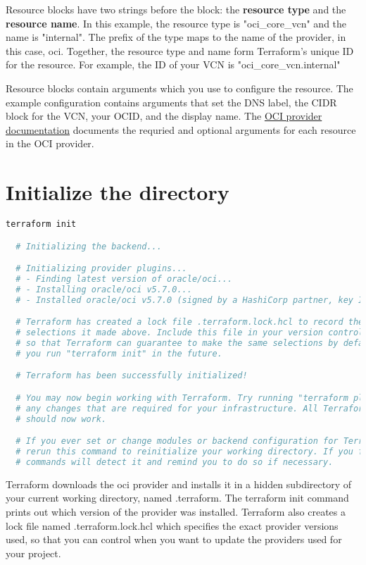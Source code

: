\documentclass[../main.tex]{subfiles}
\begin{document}
Resource blocks have two strings before the block: the \textbf{resource type} and the \textbf{resource name}.
In this example, the resource type is "oci\_core\_vcn" and the name is "internal".
The prefix of the type maps to the name of the provider, in this case, oci. 
Together, the resource type and name form Terraform's unique ID for the resource. For example, the ID of your \gls{VCN} is "oci\_core\_vcn.internal"

Resource blocks contain arguments which you use to configure the resource. The example configuration contains arguments that set the \gls{DNS} label, the \gls{CIDR} block for the \gls{VCN}, your \gls{OCID}, and the display name.
The \href{https://registry.terraform.io/providers/oracle/oci/latest}{OCI provider documentation} documents the requried and optional arguments for each resource in the \gls{OCI} provider.

\section{Initialize the directory}
\begin{lstlisting}[language=bash]
  terraform init

  # Initializing the backend...

  # Initializing provider plugins...
  # - Finding latest version of oracle/oci...
  # - Installing oracle/oci v5.7.0...
  # - Installed oracle/oci v5.7.0 (signed by a HashiCorp partner, key ID 1533A49284137CEB)

  # Terraform has created a lock file .terraform.lock.hcl to record the provider
  # selections it made above. Include this file in your version control repository
  # so that Terraform can guarantee to make the same selections by default when
  # you run "terraform init" in the future.

  # Terraform has been successfully initialized!

  # You may now begin working with Terraform. Try running "terraform plan" to see
  # any changes that are required for your infrastructure. All Terraform commands
  # should now work.

  # If you ever set or change modules or backend configuration for Terraform,
  # rerun this command to reinitialize your working directory. If you forget, other
  # commands will detect it and remind you to do so if necessary.
\end{lstlisting}
Terraform downloads the oci provider and installs it in a hidden subdirectory of your current working directory, named .terraform. The terraform init command prints out which version of the provider was installed. Terraform also creates a lock file named .terraform.lock.hcl which specifies the exact provider versions used, so that you can control when you want to update the providers used for your project.
\end{document}
